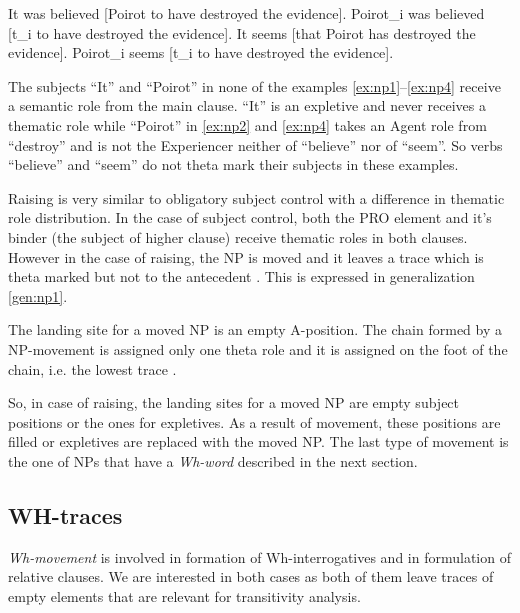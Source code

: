 \begin{exe}
	\ex\label{ex:np1} It was believed [Poirot to have destroyed the evidence].
	\ex\label{ex:np2} Poirot_{i} was believed [t_{i} to have destroyed the evidence].
	\ex\label{ex:np3} It seems [that Poirot has destroyed the evidence].
	\ex\label{ex:np4} Poirot_{i} seems [t_{i} to have destroyed the evidence].
\end{exe}

The subjects ``It'' and ``Poirot'' in none of the examples \ref{ex:np1}--\ref{ex:np4} receive a semantic role from the main clause. ``It'' is an expletive and never receives a thematic role while ``Poirot'' in \ref{ex:np2} and \ref{ex:np4} takes an Agent role from ``destroy'' and is not the Experiencer neither of ``believe'' nor of ``seem''. So verbs ``believe'' and ``seem'' do not theta mark their subjects in these examples.

Raising is very similar to obligatory subject control with a difference in thematic role distribution. In the case of subject control, both the PRO element and it's binder (the subject of higher clause) receive thematic roles in both clauses. However in the case of raising, the NP is moved and it leaves a trace which is theta marked but not to the antecedent \citep[314]{Haegeman1991}. This is expressed in generalization \ref{gen:np1}. 

\begin{generalization}\label{gen:np1} 
	The landing site for a moved NP is an empty A-position. The chain formed by a NP-movement is assigned only one theta role and it is assigned on the foot of the chain, i.e. the lowest trace \citep[314]{Haegeman1991}.
\end{generalization} 

So, in case of raising, the landing sites for a moved NP are empty subject positions or the ones for expletives. As a result of movement, these positions are filled or expletives are replaced with the moved NP. The last type of movement is the one of NPs that have a \textit{Wh-word} described in the next section.

\subsection{WH-traces}
\label{sec:wh-gbt}
\textit{Wh-movement} is involved in formation of Wh-interrogatives and in formulation of relative clauses. We are interested in both cases as both of them leave traces of empty elements that are relevant for transitivity analysis.  

